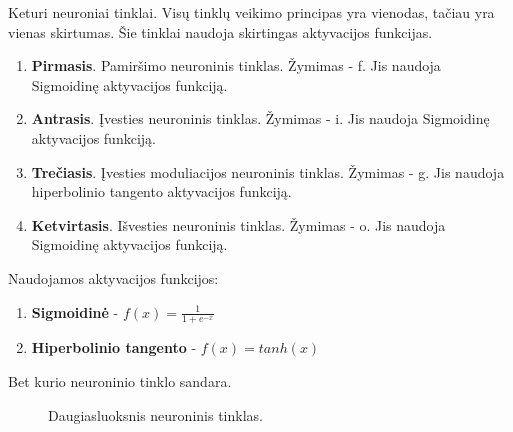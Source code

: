 Keturi neuroniai tinklai. Visų tinklų veikimo principas yra vienodas, tačiau yra vienas skirtumas. Šie tinklai naudoja skirtingas aktyvacijos funkcijas.
\begin{enumerate}
  \item \textbf{Pirmasis}. Pamiršimo neuroninis tinklas. Žymimas - f. Jis naudoja Sigmoidinę aktyvacijos funkciją.
  \item \textbf{Antrasis}. Įvesties neuroninis tinklas. Žymimas - i. Jis naudoja Sigmoidinę aktyvacijos funkciją.
  \item \textbf{Trečiasis}. Įvesties moduliacijos neuroninis tinklas. Žymimas - g. Jis naudoja hiperbolinio tangento aktyvacijos funkciją.
  \item \textbf{Ketvirtasis}. Išvesties neuroninis tinklas. Žymimas - o. Jis naudoja Sigmoidinę aktyvacijos funkciją.
\end{enumerate}

Naudojamos aktyvacijos funkcijos:
\begin{enumerate}
  \item \textbf{Sigmoidinė} - $f(x) = \frac{1}{1+e^{-x}}$
  \item \textbf{Hiperbolinio tangento} - $f(x) = tanh(x)$
\end{enumerate}

Bet kurio neuroninio tinklo sandara.

\begin{figure}[h!]
  \centering
{}
\caption{Daugiasluoksnis neuroninis tinklas.}
\label{fig:drawing}
\end{figure}

